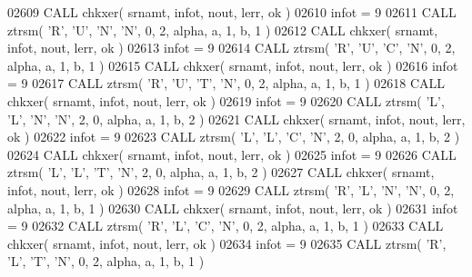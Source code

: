 \begin{DoxyCode}
02609       \textcolor{keyword}{CALL }chkxer( srnamt, infot, nout, lerr, ok )
02610       infot = 9
02611       \textcolor{keyword}{CALL }ztrsm( \textcolor{stringliteral}{'R'}, \textcolor{stringliteral}{'U'}, \textcolor{stringliteral}{'N'}, \textcolor{stringliteral}{'N'}, 0, 2, alpha, a, 1, b, 1 )
02612       \textcolor{keyword}{CALL }chkxer( srnamt, infot, nout, lerr, ok )
02613       infot = 9
02614       \textcolor{keyword}{CALL }ztrsm( \textcolor{stringliteral}{'R'}, \textcolor{stringliteral}{'U'}, \textcolor{stringliteral}{'C'}, \textcolor{stringliteral}{'N'}, 0, 2, alpha, a, 1, b, 1 )
02615       \textcolor{keyword}{CALL }chkxer( srnamt, infot, nout, lerr, ok )
02616       infot = 9
02617       \textcolor{keyword}{CALL }ztrsm( \textcolor{stringliteral}{'R'}, \textcolor{stringliteral}{'U'}, \textcolor{stringliteral}{'T'}, \textcolor{stringliteral}{'N'}, 0, 2, alpha, a, 1, b, 1 )
02618       \textcolor{keyword}{CALL }chkxer( srnamt, infot, nout, lerr, ok )
02619       infot = 9
02620       \textcolor{keyword}{CALL }ztrsm( \textcolor{stringliteral}{'L'}, \textcolor{stringliteral}{'L'}, \textcolor{stringliteral}{'N'}, \textcolor{stringliteral}{'N'}, 2, 0, alpha, a, 1, b, 2 )
02621       \textcolor{keyword}{CALL }chkxer( srnamt, infot, nout, lerr, ok )
02622       infot = 9
02623       \textcolor{keyword}{CALL }ztrsm( \textcolor{stringliteral}{'L'}, \textcolor{stringliteral}{'L'}, \textcolor{stringliteral}{'C'}, \textcolor{stringliteral}{'N'}, 2, 0, alpha, a, 1, b, 2 )
02624       \textcolor{keyword}{CALL }chkxer( srnamt, infot, nout, lerr, ok )
02625       infot = 9
02626       \textcolor{keyword}{CALL }ztrsm( \textcolor{stringliteral}{'L'}, \textcolor{stringliteral}{'L'}, \textcolor{stringliteral}{'T'}, \textcolor{stringliteral}{'N'}, 2, 0, alpha, a, 1, b, 2 )
02627       \textcolor{keyword}{CALL }chkxer( srnamt, infot, nout, lerr, ok )
02628       infot = 9
02629       \textcolor{keyword}{CALL }ztrsm( \textcolor{stringliteral}{'R'}, \textcolor{stringliteral}{'L'}, \textcolor{stringliteral}{'N'}, \textcolor{stringliteral}{'N'}, 0, 2, alpha, a, 1, b, 1 )
02630       \textcolor{keyword}{CALL }chkxer( srnamt, infot, nout, lerr, ok )
02631       infot = 9
02632       \textcolor{keyword}{CALL }ztrsm( \textcolor{stringliteral}{'R'}, \textcolor{stringliteral}{'L'}, \textcolor{stringliteral}{'C'}, \textcolor{stringliteral}{'N'}, 0, 2, alpha, a, 1, b, 1 )
02633       \textcolor{keyword}{CALL }chkxer( srnamt, infot, nout, lerr, ok )
02634       infot = 9
02635       \textcolor{keyword}{CALL }ztrsm( \textcolor{stringliteral}{'R'}, \textcolor{stringliteral}{'L'}, \textcolor{stringliteral}{'T'}, \textcolor{stringliteral}{'N'}, 0, 2, alpha, a, 1, b, 1 )

\end{DoxyCode}
